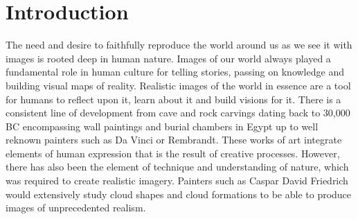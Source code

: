 \chapter{Introduction}
\label{sec:introduction}



The need and desire to faithfully reproduce the world around us as we see it with images is rooted deep in human nature. Images of our world always played a fundamental role in human culture for telling stories, passing on knowledge and building visual maps of reality. Realistic images of the world in essence are a tool for humans to reflect upon it, learn about it and build visions for it. There is a consistent line of development from cave and rock carvings dating back to 30,000 BC encompassing wall paintings and burial chambers in Egypt up to well reknown painters such as Da Vinci or Rembrandt. These works of art integrate elements of human expression that is the result of creative processes. However, there has also been the element of technique and understanding of nature, which was required to create realistic imagery. Painters such as Caspar David Friedrich would extensively study cloud shapes and cloud formations to be able to produce images of unprecedented realism.

